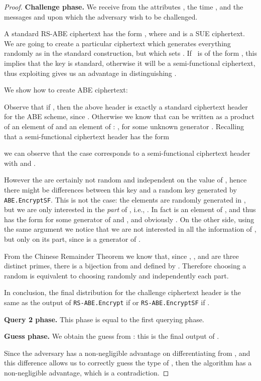 \documentclass[a4paper,10pt]{article}
\newcommand{\algorithm}[2]{\texttt{#1.#2}}
\newcommand{\game}[2]{}
\newcommand{\phase}[1]{\textbf{#1 phase.} \hspace{0pt}}
\begin{document}
\begin{proof}
	\phase{Challenge}
	We receive from  the attributes , the time , and the messages  and  upon which the adversary wish to be challenged.
	
	A standard RS-ABE ciphertext has the form , where  and  is a SUE ciphertext. We are going to create a particular ciphertext which generates everything randomly as in the standard construction, but which sets . If~ is of the form , this implies that the key is standard, otherwise it will be a semi-functional ciphertext, thus exploiting  gives us an advantage in distinguishing .
	
	We show how to create ABE ciphertext:
	
	
	Observe that if , then the above header is exactly a standard ciphertext header for the ABE scheme, since .
	Otherwise we know that  can be written as a product of an element of  and an element of : , for some unknown generator .
	Recalling that a semi-functional ciphertext header has the form 
	
	we can observe that the case  corresponds to a semi-functional ciphertext header with  and .
	
	However the  are certainly not random and independent on the value of , hence there might be differences between this key and a random key generated by \algorithm{ABE}{EncryptSF}.
	This is not the case: the elements  are randomly generated in , but we are only interested in the \emph{ part} of , i.e., . In fact  is an element of , and thus has the form  for some generator  of  and , and obviously .
	On the other side, using the same argument we notice that we are not interested in all the information of , but only on its  part, since  is a generator of .
	
	From the Chinese Remainder Theorem we know that, since , , and  are three distinct primes, there is a bijection from  and  defined by . Therefore choosing a random  is equivalent to choosing randomly and independently each  part.
	
	In conclusion, the final distribution for the challenge ciphertext header is the same as the output of \algorithm{RS-ABE}{Encrypt} if  or \algorithm{RS-ABE}{EncryptSF} if .
	
	\phase{Query 2}
	This phase is equal to the first querying phase.
	
	\phase{Guess}
	We obtain the guess  from : this is the final output of .
	
	Since the adversary  has a non-negligible advantage on differentiating \game{G}{0} from \game{G}{1}, and this difference allows us to correctly guess the type of , then the algorithm  has a non-negligible advantage, which is a contradiction.
	\end{proof}
\end{document}
